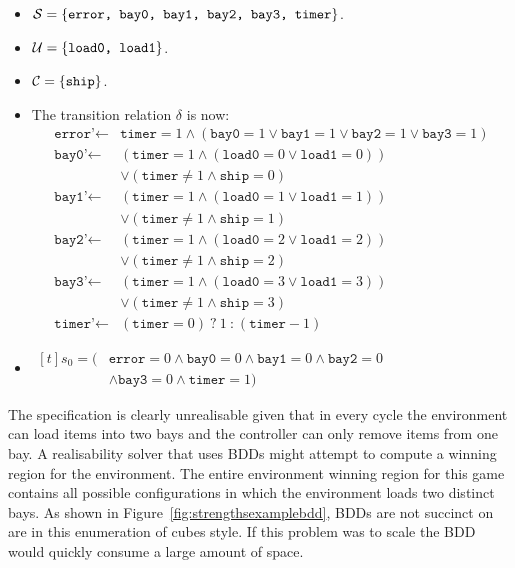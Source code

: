 \begin{itemize}
    \item $\mathcal{S} = \{ \texttt{error, bay0, bay1, bay2, bay3, timer} \} $.
    \item $\mathcal{U} = \{ \texttt{load0, load1} \} $. 
    \item $\mathcal{C} = \{ \texttt{ship} \}$.
    \item The transition relation $\delta$ is now: 
        \begin{align*}
            \texttt{error'} \gets {}& \texttt{timer} = 1 \land (\texttt{bay0} = 1 \lor \texttt{bay1} = 1 \lor \texttt{bay2} = 1 \lor \texttt{bay3} = 1 ) \\
            \texttt{bay0'} \gets {}& (\texttt{timer} = 1 \land (\texttt{load0} = 0 \lor \texttt{load1} = 0)) \\
            {}& \lor (\texttt{timer}\neq1 \land \texttt{ship} = 0) \\
            \texttt{bay1'} \gets {}& (\texttt{timer} = 1 \land (\texttt{load0} = 1 \lor \texttt{load1} = 1)) \\
            {}& \lor (\texttt{timer}\neq1 \land \texttt{ship} = 1) \\
            \texttt{bay2'} \gets {}& (\texttt{timer} = 1 \land (\texttt{load0} = 2 \lor \texttt{load1} = 2)) \\
            {}& \lor (\texttt{timer}\neq1 \land \texttt{ship} = 2) \\
            \texttt{bay3'} \gets {}& (\texttt{timer} = 1 \land (\texttt{load0} = 3 \lor \texttt{load1} = 3)) \\
            {}& \lor (\texttt{timer}\neq1 \land \texttt{ship} = 3) \\
            \texttt{timer'} \gets {}& (\texttt{timer} = 0)\ \texttt{?}\ 1\ \texttt{:}\ (\texttt{timer} - 1)
        \end{align*}
    \item $\begin{aligned}[t]
            s_0 = ({}& \texttt{error} = 0 \land \texttt{bay0} = 0 \land \texttt{bay1} = 0 \land \texttt{bay2} = 0 \\
            {}&\land \texttt{bay3} = 0 \land \texttt{timer} = 1)
        \end{aligned}$
\end{itemize}

The specification is clearly unrealisable given that in every cycle the environment can load items into two bays and the controller can only remove items from one bay. A realisability solver that uses BDDs might attempt to compute a winning region for the environment. The entire environment winning region for this game contains all possible configurations in which the environment loads two distinct bays. As shown in Figure~\ref{fig:strengthsexamplebdd}, BDDs are not succinct on are in this enumeration of cubes style. If this problem was to scale the BDD would quickly consume a large amount of space.

